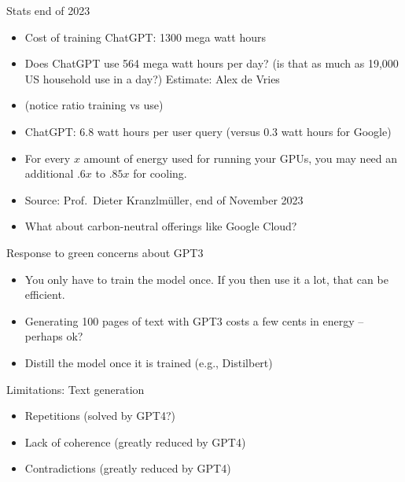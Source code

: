 \begin{vbframe}{Stats end of 2023}

\vfill

\begin{itemize}
\item  Cost of training ChatGPT: 1300 mega watt hours
\item Does ChatGPT use 564 mega watt hours per day? (is that
      as much as 19,000 US household use in a day?)
      Estimate: Alex de Vries
\item (notice ratio training vs use)
\item ChatGPT: 6.8 watt hours per user query (versus 0.3
      watt hours for Google)
\item For every $x$ amount of energy used for running your
      GPUs, you may need an additional $.6x$ to $.85x$ for
      cooling.
\item Source: Prof.\ Dieter Kranzlm\"{u}ller, end of
      November 2023
      \item What about carbon-neutral offerings like Google Cloud?
\end{itemize}

\vfill

\end{vbframe}



\begin{vbframe}{Response to green concerns about GPT3}

\vfill

  \begin{itemize}
\item You only have to train the model once. If you
then use it a lot, that can be efficient.
\item Generating 100 pages of text with GPT3 costs a
few cents in energy -- perhaps ok?
\item Distill the model once it is trained (e.g., Distilbert)
    \end{itemize}
    
\vfill

\end{vbframe}


\begin{frame}{Limitations: Text generation}

\vfill

  \begin{itemize}
\item Repetitions (solved by GPT4?)
\item Lack of coherence (greatly reduced by GPT4)
\item Contradictions (greatly reduced by GPT4)
    \end{itemize}

\vfill

\end{frame}

